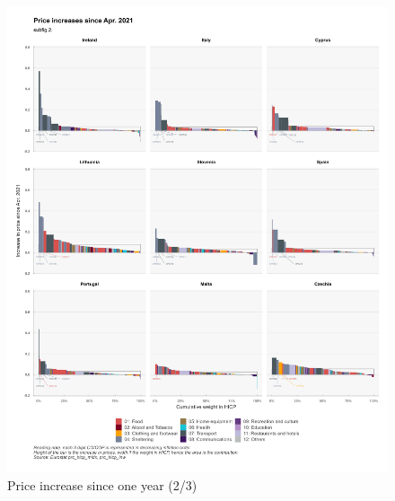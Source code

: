 \documentclass[
  9pt,
  a4paper,
  DIV=11,
  numbers=noendperiod]{scrartcl}
\begin{document}
\begin{figure}

\caption{Price increase since one year (2/3)}

{\centering \includegraphics[width=17cm,height=\textheight]{../svg/depuis_1y_2.png}

}

\end{figure}
\end{document}
